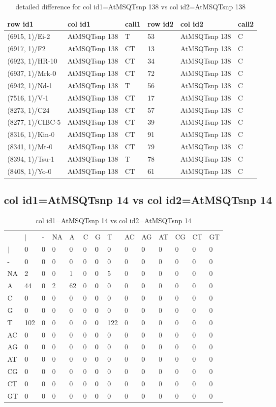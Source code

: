 \begin{center}
\begin{longtable}{|l|l|l|l|l|l|}
\caption{detailed difference for col id1=AtMSQTsnp 138 vs col id2=AtMSQTsnp 138} \label{table_dm713}\\
\hline
row id1&col id1&call1&row id2&col id2&call2\\
\hline
(6915, 1)/Ei-2&AtMSQTsnp 138&T&53&AtMSQTsnp 138&C\\
(6917, 1)/F2&AtMSQTsnp 138&CT&13&AtMSQTsnp 138&C\\
(6923, 1)/HR-10&AtMSQTsnp 138&CT&34&AtMSQTsnp 138&C\\
(6937, 1)/Mrk-0&AtMSQTsnp 138&CT&72&AtMSQTsnp 138&C\\
(6942, 1)/Nd-1&AtMSQTsnp 138&T&56&AtMSQTsnp 138&C\\
(7516, 1)/V-1&AtMSQTsnp 138&CT&17&AtMSQTsnp 138&C\\
(8273, 1)/C24&AtMSQTsnp 138&CT&57&AtMSQTsnp 138&C\\
(8277, 1)/CIBC-5&AtMSQTsnp 138&CT&39&AtMSQTsnp 138&C\\
(8316, 1)/Kin-0&AtMSQTsnp 138&CT&91&AtMSQTsnp 138&C\\
(8341, 1)/Mt-0&AtMSQTsnp 138&CT&79&AtMSQTsnp 138&C\\
(8394, 1)/Tsu-1&AtMSQTsnp 138&T&78&AtMSQTsnp 138&C\\
(8408, 1)/Yo-0&AtMSQTsnp 138&CT&61&AtMSQTsnp 138&C\\
\hline
\end{longtable}
\end{center}

\subsection{col id1=AtMSQTsnp 14 vs col id2=AtMSQTsnp 14}
\begin{center}
\begin{longtable}{|l|l|l|l|l|l|l|l|l|l|l|l|l|l|}
\caption{col id1=AtMSQTsnp 14 vs col id2=AtMSQTsnp 14} \label{table_dm714}\\
\hline
\\
\hline
&$|$&-&NA&A&C&G&T&AC&AG&AT&CG&CT&GT\\
$|$&0&0&0&0&0&0&0&0&0&0&0&0&0\\
-&0&0&0&0&0&0&0&0&0&0&0&0&0\\
NA&2&0&0&1&0&0&5&0&0&0&0&0&0\\
A&44&0&2&62&0&0&0&0&0&0&0&0&0\\
C&0&0&0&0&0&0&0&0&0&0&0&0&0\\
G&0&0&0&0&0&0&0&0&0&0&0&0&0\\
T&102&0&0&0&0&0&122&0&0&0&0&0&0\\
AC&0&0&0&0&0&0&0&0&0&0&0&0&0\\
AG&0&0&0&0&0&0&0&0&0&0&0&0&0\\
AT&0&0&0&0&0&0&0&0&0&0&0&0&0\\
CG&0&0&0&0&0&0&0&0&0&0&0&0&0\\
CT&0&0&0&0&0&0&0&0&0&0&0&0&0\\
GT&0&0&0&0&0&0&0&0&0&0&0&0&0\\
\hline
\end{longtable}
\end{center}

